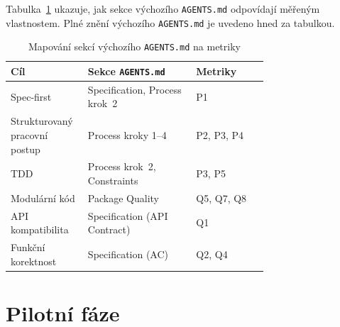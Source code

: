 Tabulka~\ref{tab:mapovani-instrukci} ukazuje, jak sekce výchozího
\texttt{AGENTS.md}
odpovídají měřeným vlastnostem. Plné znění výchozího
\texttt{AGENTS.md} je uvedeno hned za tabulkou.

\begin{table}[htbp]
\centering
\caption{Mapování sekcí výchozího \texttt{AGENTS.md} na metriky}
\label{tab:mapovani-instrukci}
\small
\begin{tabularx}{\linewidth}{@{}p{0.30\linewidth}p{0.42\linewidth}X@{}}
\toprule
\textbf{Cíl} & \textbf{Sekce \texttt{AGENTS.md}} & \textbf{Metriky} \\
\midrule
Spec-first             & Specification, Process krok~2 & \acs{P1} \\
Strukturovaný pracovní postup & Process kroky 1--4            & \acs{P2}, \acs{P3}, \acs{P4} \\
TDD                    & Process krok~2, Constraints   & \acs{P3}, \acs{P5} \\
Modulární kód          & Package Quality              & \acs{Q5}, \acs{Q7}, \acs{Q8} \\
API kompatibilita      & Specification (API Contract) & \acs{Q1} \\
Funkční korektnost     & Specification (AC)           & \acs{Q2}, \acs{Q4} \\
\bottomrule
\end{tabularx}
\end{table}

\clearpage
\begingroup
\shorthandoff{-}

\endgroup

\section{Pilotní fáze}
\label{sec:pilotni-vysledky}

